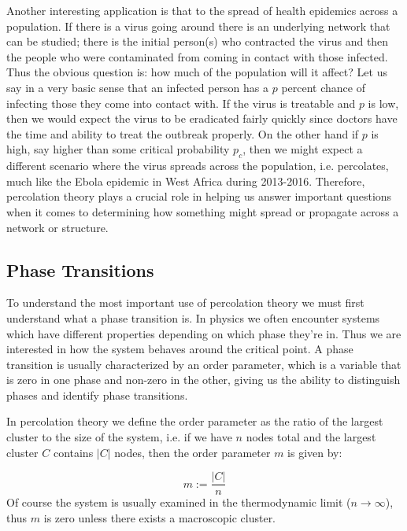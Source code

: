 Another interesting application is that to the spread of health epidemics across a population.
If there is a virus going around there is an underlying network that can be studied; there is the initial person(s) who contracted the virus and then the people who were contaminated from coming in contact with those infected.
Thus the obvious question is: how much of the population will it affect?
Let us say in a very basic sense that an infected person has a $p$ percent chance of infecting those they come into contact with.
If the virus is treatable and $p$ is low, then we would expect the virus to be eradicated fairly quickly since doctors have the time and ability to treat the outbreak properly.
On the other hand if $p$ is high, say higher than some critical probability $p_c$, then we might expect a different scenario where the virus spreads across the population, i.e. percolates, much like the Ebola epidemic in West Africa during 2013-2016.
Therefore, percolation theory plays a crucial role in helping us answer important questions when it comes to determining how something might spread or propagate across a network or structure.



\subsection{Phase Transitions}
To understand the most important use of percolation theory we must first understand what a phase transition is.
In physics we often encounter systems which have different properties depending on which phase they're in.
Thus we are interested in how the system behaves around the critical point.
A phase transition is usually characterized by an order parameter, which is a variable that is zero in one phase and non-zero in the other, giving us the ability to distinguish phases and identify phase transitions.

In percolation theory we define the order parameter as the ratio of the largest cluster to the size of the system, i.e. if we have $n$ nodes total and the largest cluster $C$ contains $|C|$ nodes, then the order parameter $m$ is given by:

\begin{equation}
	\label{eqn:order_parameter}
	m := \frac{|C|}{n}
\end{equation}
Of course the system is usually examined in the thermodynamic limit ($n \rightarrow \infty$), thus $m$ is zero unless there exists a macroscopic cluster.


